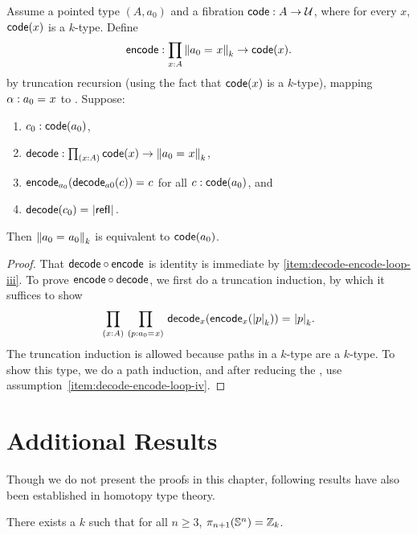 \begin{lem}
Assume a pointed type $(A,a_0)$ and a fibration
$\code : A \to \type$, where for every $x$, $\code(x)$ is a $k$-type.
Define 
\[
\encode : \prd{x:A} \trunc{k}{\id{a_0}{x}} \to \code(x).
\]
by truncation recursion (using the fact
that $\code(x)$ is a $k$-type), mapping $\alpha : \id{a_0}{x}$ to 
. Suppose:
\begin{enumerate}
\item $c_0 : \code(a_0)$,
\item $\decode : \prd{x:A} \code(x) \to \trunc{k}{\id{a_0}{x}}$,
\item \label{item:decode-encode-loop-iii}
  $\id{\encode_{a_0}(\decode_{a0}(c))}{c}$ for all $c : \code(a_0)$, and
\item \label{item:decode-encode-loop-iv}
  $\id{\decode(c_0)}{\tproj{}{\refl{}}}$.
\end{enumerate}
Then $\trunc{k}{\id{a_0}{a_0}}$ is equivalent to $\code(a_0)$.
\end{lem}

\begin{proof}
That $\decode \circ \encode$ is identity is immediate by \ref{item:decode-encode-loop-iii}.
%
To prove $\encode \circ \decode$, we first do a truncation induction, by
which it suffices to show
\[
\prd{x:A}{p : \id{a_0}{x}} \id{\decode_{x}(\encode_{x}(\tproj{k}{p}))}{\tproj{k}{p}}.
\] 
The truncation induction is allowed because paths in a $k$-type are a
$k$-type.  To show this type, we do a path induction, and after reducing
the \encode, use assumption~\ref{item:decode-encode-loop-iv}.
\end{proof}

\section{Additional Results}
\label{sec:moreresults}

Though we do not present the proofs in this chapter, following results have also been established in homotopy type theory.  

\begin{thm}
There exists a $k$ such that for all $n \ge 3$, $\pi_{n+1}(\Sn ^n) =
\Z_k$.  
\end{thm}


